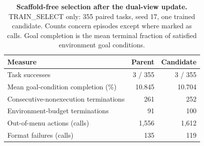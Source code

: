 \begin{table}[!htbp]
\caption{\textbf{Scaffold-free selection after the dual-view update.}
TRAIN\_SELECT only: 355 paired tasks, seed 17, one trained candidate.
Counts concern episodes except where marked as calls. Goal completion
is the mean terminal fraction of satisfied environment goal conditions.}
\label{tab:ablations}\centering
\begin{tabularx}{\linewidth}{Xrr}\toprule
Measure & Parent & Candidate\\\midrule
Task successes & 3 / 355 & 3 / 355\\
Mean goal-condition completion (\%) & 10.845 & 10.704\\
Consecutive-nonexecution terminations & 261 & 252\\
Environment-budget terminations & 91 & 100\\
Out-of-menu actions (calls) & 1,556 & 1,612\\
Format failures (calls) & 135 & 119\\\bottomrule
\end{tabularx}
\end{table}
